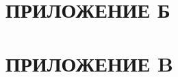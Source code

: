 \documentclass[14pt, a4paper] {extarticle}
\newcommand{\includecode}[3]{}
\begin{document}
	\newpage
    \section*{ПРИЛОЖЕНИЕ Б}
        \includecode{c}{code/q_cbwfq.c}{Модуль CBWFQ для утилиты tc.}

	\newpage
    \section*{ПРИЛОЖЕНИЕ B}
        \includecode{c}{code/sch_cbwfq.c}{Модуль CBWFQ для ядра Linux.}
\end{document}
